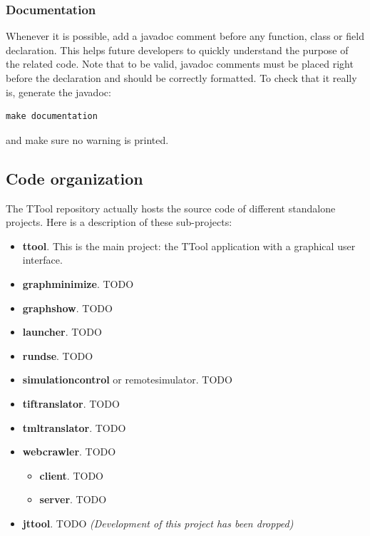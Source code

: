 \documentclass[12pt]{article}
\begin{document}
\subsubsection{Documentation}
Whenever it is possible, add a javadoc comment before any function, class or
field declaration. This helps future developers to quickly understand the
purpose of the related code. Note that to be valid, javadoc comments must be
placed right before the declaration and should be correctly formatted. To check
that it really is, generate the javadoc:
\begin{verbatim}
make documentation
\end{verbatim}
and make sure no warning is printed.

\subsection{Code organization}
The TTool repository actually hosts the source code of different standalone
projects. Here is a description of these sub-projects:
\begin{itemize}
    \item \textbf{ttool}. This is the main project: the TTool application with a
        graphical user interface.
    \item \textbf{graphminimize}. TODO
    \item \textbf{graphshow}. TODO
    \item \textbf{launcher}. TODO
    \item \textbf{rundse}. TODO
    \item \textbf{simulationcontrol} or remotesimulator. TODO
    \item \textbf{tiftranslator}. TODO
    \item \textbf{tmltranslator}. TODO
    \item \textbf{webcrawler}. TODO
        \begin{itemize}
            \item \textbf{client}. TODO
            \item \textbf{server}. TODO
        \end{itemize}
    \item \textbf{jttool}. TODO \textit{(Development of this project has been
        dropped)}
\end{itemize}
\end{document}
